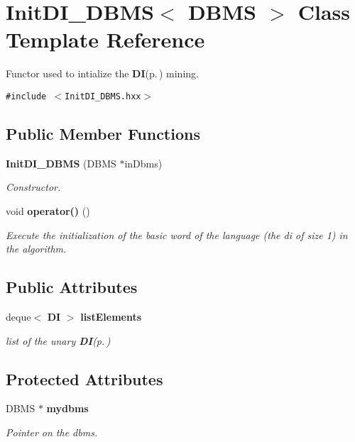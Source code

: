 \section{Init\-DI\_\-DBMS$<$ DBMS $>$ Class Template Reference}
\label{class_init_d_i___d_b_m_s}
Functor used to intialize the {\bf DI}{\rm (p.\,\pageref{class_d_i})} mining.  


{\tt \#include $<$Init\-DI\_\-DBMS.hxx$>$}

\subsection*{Public Member Functions}
\begin{CompactItemize}
\item 
{\bf Init\-DI\_\-DBMS} (DBMS $\ast$in\-Dbms)
\begin{CompactList}\small\item\em Constructor. \item\end{CompactList}\item 
void {\bf operator()} ()\label{class_init_d_i___d_b_m_s_af402c1c47b48d2451b50f053a48472e}

\begin{CompactList}\small\item\em Execute the initialization of the basic word of the language (the di of size 1) in the algorithm. \item\end{CompactList}\end{CompactItemize}
\subsection*{Public Attributes}
\begin{CompactItemize}
\item 
deque$<$ {\bf DI} $>$ {\bf list\-Elements}\label{class_init_d_i___d_b_m_s_09117bbeb3d2d54345f10c51e4adf2e2}

\begin{CompactList}\small\item\em list of the unary {\bf DI}{\rm (p.\,\pageref{class_d_i})} \item\end{CompactList}\end{CompactItemize}
\subsection*{Protected Attributes}
\begin{CompactItemize}
\item 
DBMS $\ast$ {\bf mydbms}\label{class_init_d_i___d_b_m_s_aa17c74cfc15150da496ba7a3b7c4877}

\begin{CompactList}\small\item\em Pointer on the dbms. \item\end{CompactList}\end{CompactItemize}


